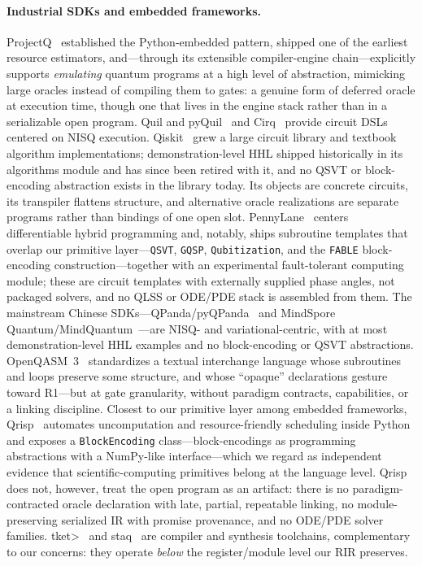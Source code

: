 \paragraph{Industrial SDKs and embedded frameworks.}
ProjectQ~\cite{steiger2018projectq} established the Python-embedded pattern,
shipped one of the earliest resource estimators, and---through its
extensible compiler-engine chain---explicitly supports \emph{emulating}
quantum programs at a high level of abstraction, mimicking large oracles
instead of compiling them to gates: a genuine form of deferred oracle at
execution time, though one that lives in the engine stack rather than in a
serializable open program.  Quil and pyQuil~\cite{smith2016quil} and
Cirq~\cite{cirqdevelopers2020cirq} provide circuit DSLs centered on NISQ execution.
Qiskit~\cite{javadiabhari2024qiskit} grew a large circuit library and textbook algorithm
implementations; demonstration-level HHL shipped historically in its
algorithms module and has since been retired with it, and no QSVT or
block-encoding abstraction exists in the library today.  Its objects are
concrete circuits, its transpiler flattens structure, and alternative oracle
realizations are separate programs rather than bindings of one open slot.
PennyLane~\cite{bergholm2018pennylane} centers differentiable hybrid
programming and, notably, ships subroutine templates that overlap our
primitive layer---\texttt{QSVT}, \texttt{GQSP}, \texttt{Qubitization}, and
the \texttt{FABLE} block-encoding construction---together with an
experimental fault-tolerant computing module; these are circuit templates
with externally supplied phase angles, not packaged solvers, and no QLSS
or ODE/PDE stack is assembled from them.  The mainstream Chinese
SDKs---QPanda/pyQPanda~\cite{originq2024qpanda} and MindSpore
Quantum/MindQuantum~\cite{xu2024mindquantum}---are NISQ- and
variational-centric, with at most demonstration-level HHL examples and no
block-encoding or QSVT abstractions.
OpenQASM~3~\cite{cross2022openqasm3} standardizes a textual interchange
language whose subroutines and loops preserve some structure, and whose
``opaque'' declarations gesture toward R1---but at gate granularity,
without paradigm contracts, capabilities, or a linking discipline.
Closest to our primitive layer among embedded frameworks, Qrisp~\cite{seidel2023qrisp}
automates uncomputation and resource-friendly scheduling inside Python and
exposes a \texttt{BlockEncoding} class---block-encodings as programming
abstractions with a {NumPy}-like interface---which we regard as independent
evidence that scientific-computing primitives belong at the language level.
Qrisp does not, however, treat the open program as an artifact: there is no
paradigm-contracted oracle declaration with late, partial, repeatable
linking, no module-preserving serialized IR with promise provenance, and no
ODE/PDE solver families.  t\textbar ket\textgreater~\cite{sivarajah2021tket} and
staq~\cite{amy2020staq} are compiler and synthesis toolchains,
complementary to our concerns: they operate \emph{below} the register/module
level our RIR preserves.

